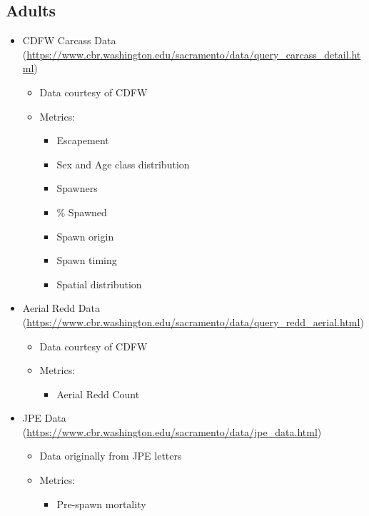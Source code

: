 \documentclass[
]{book}
\providecommand{\tightlist}{%
  \setlength{\itemsep}{0pt}\setlength{\parskip}{0pt}}
\theoremstyle{definition}
\theoremstyle{definition}
\theoremstyle{definition}
\theoremstyle{definition}
\theoremstyle{remark}
\begin{document}
\hypertarget{adults-1}{%
\subsection{Adults}\label{adults-1}}

\begin{itemize}
\tightlist
\item
  CDFW Carcass Data (\url{https://www.cbr.washington.edu/sacramento/data/query_carcass_detail.html})

  \begin{itemize}
  \tightlist
  \item
    Data courtesy of CDFW
  \item
    Metrics:

    \begin{itemize}
    \tightlist
    \item
      Escapement
    \item
      Sex and Age class distribution
    \item
      Spawners
    \item
      \% Spawned
    \item
      Spawn origin
    \item
      Spawn timing
    \item
      Spatial distribution
    \end{itemize}
  \end{itemize}
\item
  Aerial Redd Data (\url{https://www.cbr.washington.edu/sacramento/data/query_redd_aerial.html})

  \begin{itemize}
  \tightlist
  \item
    Data courtesy of CDFW
  \item
    Metrics:

    \begin{itemize}
    \tightlist
    \item
      Aerial Redd Count
    \end{itemize}
  \end{itemize}
\item
  JPE Data (\url{https://www.cbr.washington.edu/sacramento/data/jpe_data.html})

  \begin{itemize}
  \tightlist
  \item
    Data originally from JPE letters
  \item
    Metrics:

    \begin{itemize}
    \tightlist
    \item
      Pre-spawn mortality
    \end{itemize}
  \end{itemize}
\end{itemize}
\end{document}
